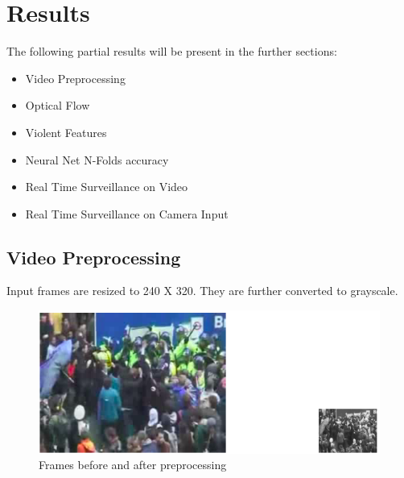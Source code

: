 \clearpage
\chapter{Results}
The following partial results will be present in the further sections:
\begin{itemize}
	\item Video Preprocessing
	\item Optical Flow
	\item Violent Features
	\item Neural Net N-Folds accuracy
	\item Real Time Surveillance on Video
	\item Real Time Surveillance on Camera Input
\end{itemize}
\section{Video Preprocessing}
 Input frames are resized to 240 X 320. They are further converted to grayscale.
\begin{center}
\begin{figure}[H]
\centering
\includegraphics[width = \linewidth]{frame_resize.png}
\caption{Frames before and after preprocessing}
\end{figure}
\end{center}
